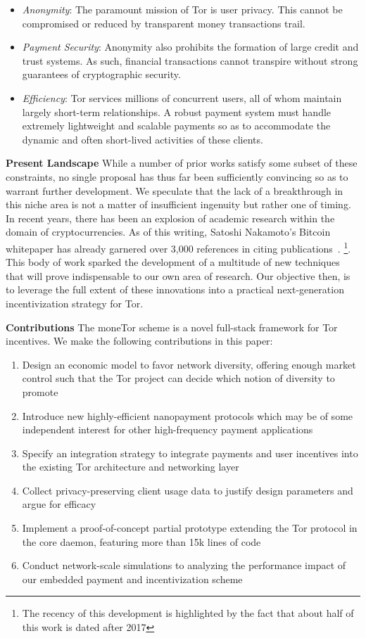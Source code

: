 \begin{itemize}
\item \emph{Anonymity}: The paramount mission of Tor is user privacy. This
  cannot be compromised or reduced by transparent money transactions trail.
\item \emph{Payment Security}: Anonymity also prohibits the formation of large
  credit and trust systems. As such, financial transactions cannot transpire
  without strong guarantees of cryptographic security.
\item \emph{Efficiency}: Tor services millions of concurrent users, all of whom
  maintain largely short-term relationships. A robust payment system must handle
  extremely lightweight and scalable payments so as to accommodate the dynamic
  and often short-lived activities of these clients.
\end{itemize}

\textbf{Present Landscape} While a number of prior works satisfy some subset of
these constraints, no single proposal has thus far been sufficiently convincing
so as to warrant further development. We speculate that the lack of a
breakthrough in this niche area is not a matter of insufficient ingenuity but
rather one of timing. In recent years, there has been an explosion of academic
research within the domain of cryptocurrencies. As of this writing, Satoshi
Nakamoto's Bitcoin whitepaper has already garnered over 3,000 references in
citing publications~\cite{nakamoto2008bitcoin}.
\footnote{The recency of this
  development is highlighted by the fact that about half of this work is dated
  after 2017}. 
This body of work sparked the development of a multitude of new techniques that
will prove indispensable to our own area of research. Our objective then, is to
leverage the full extent of these innovations into a practical next-generation
incentivization strategy for Tor.

\label{sec:Contributions}
\textbf{Contributions} The moneTor scheme is a novel full-stack framework for
Tor incentives. We make the following contributions in this paper:

\begin{enumerate}
\item Design an economic model to favor network diversity, offering enough
  market control such that the Tor project can decide which notion of diversity
  to promote
\item Introduce new highly-efficient nanopayment protocols which may be of some
  independent interest for other high-frequency payment applications
\item Specify an integration strategy to integrate payments and user incentives
  into the existing Tor architecture and networking layer
\item Collect privacy-preserving client usage data to justify design parameters
  and argue for efficacy
\item Implement a proof-of-concept partial prototype extending the Tor protocol
  in the core daemon, featuring more than 15k lines of code
\item Conduct network-scale simulations to analyzing the performance impact of
  our embedded payment and incentivization scheme
\end{enumerate}

